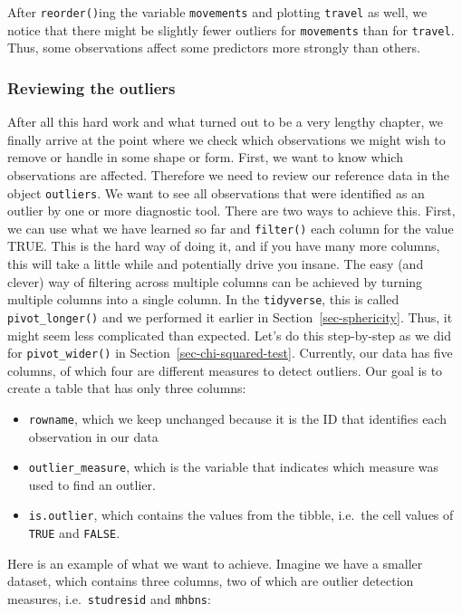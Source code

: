 \documentclass[
  letterpaper,
]{krantz}
\begin{document}
After \texttt{reorder()}ing the variable \texttt{movements} and plotting
\texttt{travel} as well, we notice that there might be slightly fewer
outliers for \texttt{movements} than for \texttt{travel}. Thus, some
observations affect some predictors more strongly than others.

\subsubsection{Reviewing the outliers}\label{sec-reviewing-the-outliers}

After all this hard work and what turned out to be a very lengthy
chapter, we finally arrive at the point where we check which
observations we might wish to remove or handle in some shape or form.
First, we want to know which observations are affected. Therefore we
need to review our reference data in the object \texttt{outliers}. We
want to see all observations that were identified as an outlier by one
or more diagnostic tool. There are two ways to achieve this. First, we
can use what we have learned so far and \texttt{filter()} each column
for the value TRUE. This is the hard way of doing it, and if you have
many more columns, this will take a little while and potentially drive
you insane. The easy (and clever) way of filtering across multiple
columns can be achieved by turning multiple columns into a single
column. In the \texttt{tidyverse}, this is called
\texttt{pivot\_longer()} and we performed it earlier in
Section~\ref{sec-sphericity}. Thus, it might seem less complicated than
expected. Let's do this step-by-step as we did for
\texttt{pivot\_wider()} in Section~\ref{sec-chi-squared-test}.
Currently, our data has five columns, of which four are different
measures to detect outliers. Our goal is to create a table that has only
three columns:

\begin{itemize}
\item
  \texttt{rowname}, which we keep unchanged because it is the ID that
  identifies each observation in our data
\item
  \texttt{outlier\_measure}, which is the variable that indicates which
  measure was used to find an outlier.
\item
  \texttt{is.outlier}, which contains the values from the tibble,
  i.e.~the cell values of \texttt{TRUE} and \texttt{FALSE}.
\end{itemize}

Here is an example of what we want to achieve. Imagine we have a smaller
dataset, which contains three columns, two of which are outlier
detection measures, i.e.~\texttt{studresid} and \texttt{mhbns}:
\end{document}
